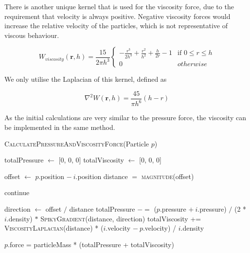 \documentclass[12pt]{article}
\begin{document}
    There is another unique kernel that is used for the viscosity force, due to the requirement that velocity is always positive. Negative viscosity forces would increase the relative velocity of the particles, which is not representative of viscous behaviour.

    \begin{equation}
        W_{viscosity}(\textbf{r}, h) = \frac{15}{2\pi{h}^3}
        \begin{cases}
            -\frac{r^3}{2h^3}+\frac{r^2}{h^2}+\frac{h}{2r} - 1 & \text{if } 0 \leq r \leq h \\
            0 & otherwise
        \end{cases}
    \end{equation}

    We only utilise the Laplacian of this kernel, defined as

    \begin{equation}
        \nabla^2W(\textbf{r}, h) = \frac{45}{\pi{h}^6}(h - r)
    \end{equation}

    As the initial calculations are very similar to the pressure force, the viscosity can be implemented in the same method.

    \begin{algorithm}[H]
        \caption{\textsc{CalculatePressureAndViscosityForce}(Particle $p$)}

        \begin{algorithmic}[1]
            \State totalPressure $\gets$ [0, 0, 0]
            \State totalViscosity $\gets$ [0, 0, 0]

                \State offset $\gets$ $p$.position $-\ i$.position
                \State distance $=$ \textsc{magnitude}(offset)

                    continue
                \EndIf

                \State direction $\gets$ offset $/$ distance
                \State totalPressure $-=$ ($p$.pressure $+\ i$.pressure) $/$ (2 * $i$.density) $*$ \textsc{SpikyGradient}(distance, direction)
                \State totalViscosity += \textsc{ViscosityLaplacian}(distance) *
                \Statex \hspace{\algorithmicindent} ($i$.velocity $-\ p$.velocity) / $i$.density
            \EndFor
            
            \State $p$.force = particleMass * (totalPressure + totalViscosity)
        \end{algorithmic}

    \end{algorithm}
\end{document}
